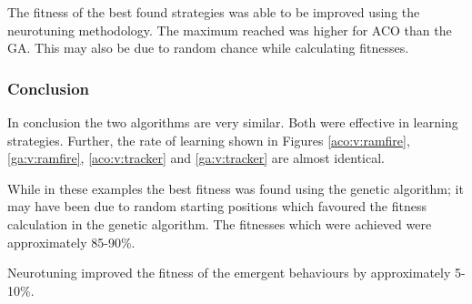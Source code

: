 The fitness of the best found strategies was able to be improved using the neurotuning methodology. The maximum reached was higher for ACO than the GA. This may also be due to random chance while calculating fitnesses.

\FigStrategyTune

\subsubsection{Conclusion}
In conclusion the two algorithms are very similar. Both were effective in learning strategies. Further, the rate of learning shown in Figures \ref{aco:v:ramfire}, \ref{ga:v:ramfire}, \ref{aco:v:tracker} and \ref{ga:v:tracker} are almost identical.

While in these examples the best fitness was found using the genetic algorithm; it may have been due to random starting positions which favoured the fitness calculation in the genetic algorithm. The fitnesses which were achieved were approximately 85-90\%.

Neurotuning improved the fitness of the emergent behaviours by approximately 5-10\%.
